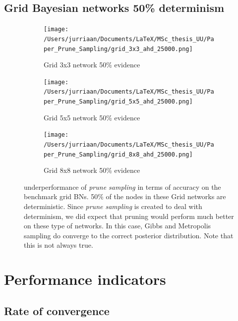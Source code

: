 \documentclass[a4paper, twoside, 11pt]{report}
\theoremstyle{plain}
\theoremstyle{definition}
\theoremstyle{remark}
\newcommand{\ps}{\textit{prune sampling }}
\begin{document}
\subsection{Grid Bayesian networks 50\% determinism}
\begin{figure}[H]
\centering
\begin{subfigure}{0.49\textwidth}
\texttt{[image: /Users/jurriaan/Documents/LaTeX/MSc\_thesis\_UU/Paper\_Prune\_Sampling/grid\_3x3\_ahd\_25000.png]}
\caption{Grid 3x3 network 50\% evidence}%
\label{grid_3x3}%
\end{subfigure}\hfill%
\begin{subfigure}{0.49\textwidth}
\texttt{[image: /Users/jurriaan/Documents/LaTeX/MSc\_thesis\_UU/Paper\_Prune\_Sampling/grid\_5x5\_ahd\_25000.png]}
\caption{Grid 5x5 network 50\% evidence}%
\label{grid_5x5}%
\end{subfigure}
\begin{subfigure}{0.49\textwidth}
\texttt{[image: /Users/jurriaan/Documents/LaTeX/MSc\_thesis\_UU/Paper\_Prune\_Sampling/grid\_8x8\_ahd\_25000.png]}
\caption{Grid 8x8 network 50\% evidence}%
\label{grid_8x8}%
\end{subfigure}\hfill%
\caption{underperformance of \ps in terms of accuracy on the benchmark grid BNs. 50\% of the nodes in these Grid networks are deterministic. Since \ps is created to deal with determinism, we did expect that pruning would perform much better on these type of networks. In this case, Gibbs and Metropolis sampling do converge to the correct posterior distribution. Note that this is not always true.}
\label{results1}
\end{figure}


\section{Performance indicators}
\subsection{Rate of convergence}
\end{document}
